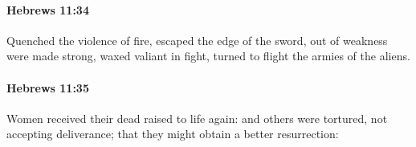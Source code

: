 		\paragraph{Hebrews 11:34} %
			\label{HEBREWS-11-34}

			Quenched the violence of fire, escaped the edge of the sword, out of weakness were made strong, waxed valiant in fight, turned to flight the armies of the aliens.

			\begin{framed}
			\scriptsize
				\begin{compactdesc}
					\item[SBLG] 
				\end{compactdesc}
			\end{framed}

		\paragraph{Hebrews 11:35} %
			\label{HEBREWS-11-35}

			Women received their dead raised to life again: and others were tortured, not accepting deliverance; that they might obtain a better resurrection:

